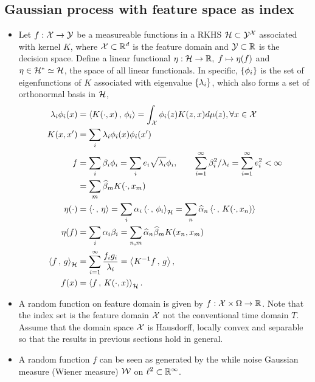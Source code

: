 \documentclass[11pt]{article}
\begin{document}
\subsection{Gaussian process with feature space as index}
\begin{itemize}
\item Let  $f: {\mathcal X} \rightarrow {\mathcal Y}$ be a measureable functions in a RKHS ${\mathcal H} \subset  {\mathcal Y}^{{\mathcal X}}$ associated with kernel $K$, where ${\mathcal X}\subset {\mathbb R}^{d}$ is the feature domain and ${\mathcal Y} \subset {\mathbb R}$ is the decision space.  Define a linear functional  $\eta : {\mathcal H} \rightarrow {\mathbb R},\; f\mapsto \eta(f)$ and $\eta \in {\mathcal H}^{*}\simeq {\mathcal H}$, the space of all linear functionals. In specific, $\left\{\phi_{i}\right\}$ is the set of eigenfunctions of $K$ associated with eigenvalue $\left\{\lambda_{i}\right\}$, which also forms a set of orthonormal basis in ${\mathcal H}$,
\begin{align*}
\lambda_{i}\phi_{i}(x) &= \left\langle K(\cdot, x)\,,\, \phi_{i} \right\rangle= \int_{{\mathcal X}}\phi_{i}(z)K(z,x)d\mu(z), \forall x\in {\mathcal X}\\
K(x,x') &= \sum_{i}\lambda_{i}\phi_{i}(x)\phi_{i}(x')\\
f&= \sum_{i}\beta_{i}\phi_{i}= \sum_{i}e_{i}\sqrt{\lambda_{i}}\phi_{i}, \qquad \sum_{i=1}^{\infty}\beta_{i}^{2}/\lambda_{i}=\sum_{i=1}^{\infty}e_{i}^{2} <\infty\\
&= \sum_{m}\widehat{\beta}_{m}K(\cdot, x_{m}) \\
\eta(\cdot) &= \left\langle \cdot\,,\, \eta \right\rangle = \sum_{i}\alpha_{i}\left\langle \cdot\,,\, \phi_{i} \right\rangle_{{\mathcal H}} = \sum_{n}\widehat{\alpha}_{n}\left\langle \cdot\,,\, K(\cdot, x_{n}) \right\rangle \\
\eta(f) &= \sum_{i}\alpha_{i}\beta_{i} = \sum_{n,m}\widehat{\alpha}_{n}\widehat{\beta}_{m}K(x_{n}, x_{m})\\
\left\langle f\,,\, g \right\rangle_{{\mathcal H}} &= \sum_{i=1}^{\infty}\frac{f_{i}g_{i}}{\lambda_{i}} = \left\langle K^{-1}f\,,\, g \right\rangle, \\  
f(x)&= \left\langle f\,,\, K(\cdot, x) \right\rangle_{{\mathcal H}}.\\
\end{align*}



\item A random function on feature domain is given by $f: {\mathcal X} \times \Omega \rightarrow {\mathbb R}$. Note that the index set is the feature domain ${\mathcal X}$ not the conventional time domain $T$. Assume that the domain space ${\mathcal X}$ is Hausdorff, locally convex and separable so that the results in previous sections hold in general. \\[10pt]

\item A random function $f$ can be seen as generated by the while noise Gaussian measure (Wiener measure) ${\mathcal W}$ on $\ell^{2}\subset {\mathbb R}^{\infty}$.


\end{itemize}
\end{document}
